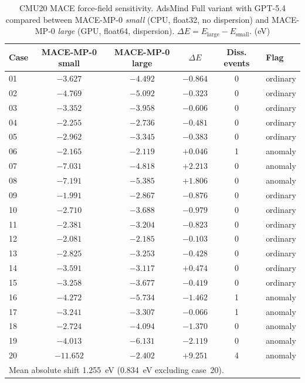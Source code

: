 \documentclass[%
 preprint,
 superscriptaddress,
 amsmath,amssymb,
 aps,
 prb,
 floatfix,
]{revtex4-2}
\begin{document}
\begin{table}[ht]
\centering
\caption{CMU20 MACE force-field sensitivity. AdsMind Full variant with GPT-5.4 compared between MACE-MP-0 \textit{small} (CPU, float32, no dispersion) and MACE-MP-0 \textit{large} (GPU, float64, dispersion). $\Delta E = E_\mathrm{large} - E_\mathrm{small}$. (eV)}
\label{tab:si-mace-sensitivity}
\begin{tabular}{lccccl}
\toprule
Case & MACE-MP-0 small & MACE-MP-0 large & $\Delta E$ & Diss. events & Flag \\
\midrule
01 & $-3.627$ & $-4.492$ & $-0.864$ & 0 & ordinary \\
02 & $-4.769$ & $-5.092$ & $-0.323$ & 0 & ordinary \\
03 & $-3.352$ & $-3.958$ & $-0.606$ & 0 & ordinary \\
04 & $-2.255$ & $-2.736$ & $-0.481$ & 0 & ordinary \\
05 & $-2.962$ & $-3.345$ & $-0.383$ & 0 & ordinary \\
06 & $-2.165$ & $-2.119$ & $+0.046$ & 1 & anomaly \\
07 & $-7.031$ & $-4.818$ & $+2.213$ & 0 & anomaly \\
08 & $-7.191$ & $-5.385$ & $+1.806$ & 0 & anomaly \\
09 & $-1.991$ & $-2.867$ & $-0.876$ & 0 & ordinary \\
10 & $-2.710$ & $-3.688$ & $-0.979$ & 0 & ordinary \\
11 & $-2.381$ & $-3.204$ & $-0.823$ & 0 & ordinary \\
12 & $-2.081$ & $-2.185$ & $-0.103$ & 0 & ordinary \\
13 & $-2.825$ & $-3.253$ & $-0.428$ & 0 & ordinary \\
14 & $-3.591$ & $-3.117$ & $+0.474$ & 0 & ordinary \\
15 & $-3.258$ & $-3.677$ & $-0.419$ & 0 & ordinary \\
16 & $-4.272$ & $-5.734$ & $-1.462$ & 1 & anomaly \\
17 & $-3.241$ & $-3.307$ & $-0.066$ & 1 & anomaly \\
18 & $-2.724$ & $-4.094$ & $-1.370$ & 0 & anomaly \\
19 & $-4.013$ & $-6.131$ & $-2.119$ & 0 & anomaly \\
20 & $-11.652$ & $-2.402$ & $+9.251$ & 4 & anomaly \\
\midrule
\multicolumn{6}{l}{Mean absolute shift 1.255~eV (0.834~eV excluding case~20).} \\
\bottomrule
\end{tabular}%
\end{table}
\end{document}
